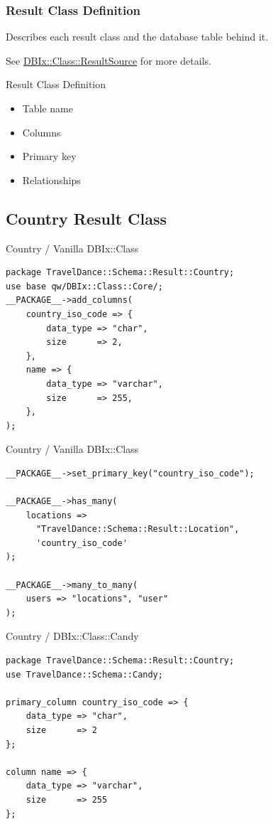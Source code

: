 \subsubsection{Result Class Definition}
Describes each result class and the database table behind it. 

See \href{https://metacpan.org/pod/DBIx::Class::ResultSource}{DBIx::Class::ResultSource} for more details.

\begin{frame}{Result Class Definition}

\begin{itemize}
\item Table name
\item Columns
\item Primary key
\item Relationships
\end{itemize}
\end{frame}

\subsection{Country Result Class}

\begin{frame}[fragile]{Country / Vanilla DBIx::Class}
\begin{lstlisting}
package TravelDance::Schema::Result::Country;
use base qw/DBIx::Class::Core/;
__PACKAGE__->add_columns(
    country_iso_code => {
        data_type => "char",
        size      => 2,
    },
    name => {
        data_type => "varchar",
        size      => 255,
    },
);
\end{lstlisting}
\end{frame}

\begin{frame}[fragile]{Country / Vanilla DBIx::Class}
\begin{lstlisting}
__PACKAGE__->set_primary_key("country_iso_code");

__PACKAGE__->has_many(
    locations =>
      "TravelDance::Schema::Result::Location",
      'country_iso_code'
);

__PACKAGE__->many_to_many(
    users => "locations", "user"
);
\end{lstlisting}
\end{frame}

\begin{frame}[fragile]{Country / DBIx::Class::Candy}
\begin{lstlisting}
package TravelDance::Schema::Result::Country;
use TravelDance::Schema::Candy;

primary_column country_iso_code => {
    data_type => "char",
    size      => 2
};

column name => {
    data_type => "varchar",
    size      => 255
};
\end{lstlisting}
\end{frame}

